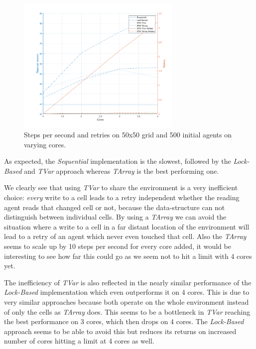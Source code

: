 \begin{figure}
	\centering
	\includegraphics[width=0.7\textwidth, angle=0]{./fig/sugarscape/varying_cores.png}
	\caption{Steps per second and retries on 50x50 grid and 500 initial agents on varying cores.}
	\label{fig:varying_cores}
\end{figure}

As expected, the \textit{Sequential} implementation is the slowest, followed by the \textit{Lock-Based} and \textit{TVar} approach whereas \textit{TArray} is the best performing one.

We clearly see that using \textit{TVar} to share the environment is a very inefficient choice: \textit{every} write to a cell leads to a retry independent whether the reading agent reads that changed cell or not, because the data-structure can not distinguish between individual cells. By using a \textit{TArray} we can avoid the situation where a write to a cell in a far distant location of the environment will lead to a retry of an agent which never even touched that cell. Also the \textit{TArray} seems to scale up by 10 steps per second for every core added, it would be interesting to see how far this could go as we seem not to hit a limit with 4 cores yet.

The inefficiency of \textit{TVar} is also reflected in the nearly similar performance of the \textit{Lock-Based} implementation which even outperforms it on 4 cores. This is due to very similar approaches because both operate on the whole environment instead of only the cells as \textit{TArray} does. This seems to be a bottleneck in \textit{TVar} reaching the best performance on 3 cores, which then drops on 4 cores. The \textit{Lock-Based} approach seems to be able to avoid this but reduces its returns on increased number of cores hitting a limit at 4 cores as well.


